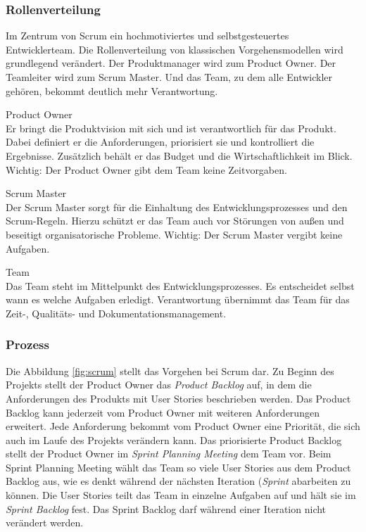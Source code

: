 \subsubsection{Rollenverteilung}
Im Zentrum von Scrum ein hochmotiviertes und selbstgesteuertes Entwicklerteam. Die Rollenverteilung von klassischen Vorgehensmodellen wird grundlegend verändert. Der Produktmanager wird zum Product Owner. Der Teamleiter wird zum Scrum Master. Und das Team, zu dem alle Entwickler gehören, bekommt deutlich mehr Verantwortung.

\begin{description}
\item{Product Owner}\\
Er bringt die Produktvision mit sich und ist verantwortlich für das Produkt. Dabei definiert er die Anforderungen, priorisiert sie und kontrolliert die Ergebnisse. Zusätzlich behält er das Budget und die Wirtschaftlichkeit im Blick. Wichtig: Der Product Owner gibt dem Team keine Zeitvorgaben.

\item{Scrum Master}\\
Der Scrum Master sorgt für die Einhaltung des Entwicklungsprozesses und den Scrum-Regeln. Hierzu schützt er das Team auch vor Störungen von außen und beseitigt organisatorische Probleme. Wichtig: Der Scrum Master vergibt keine Aufgaben.

\item{Team}\\
Das Team steht im Mittelpunkt des Entwicklungsprozesses. Es entscheidet selbst wann es welche Aufgaben erledigt. Verantwortung übernimmt das Team für das Zeit-, Qualitäts- und Dokumentationsmanagement.
\end{description}

\subsubsection{Prozess}
Die Abbildung \ref{fig:scrum} stellt das Vorgehen bei Scrum dar. Zu Beginn des Projekts stellt der Product Owner das \emph{Product Backlog} auf, in dem die Anforderungen des Produkts mit User Stories beschrieben werden. Das Product Backlog kann jederzeit vom Product Owner mit weiteren Anforderungen erweitert. Jede Anforderung bekommt vom Product Owner eine Priorität, die sich auch im Laufe des Projekts verändern kann. Das priorisierte Product Backlog stellt der Product Owner im \emph{Sprint Planning Meeting} dem Team vor. Beim Sprint Planning Meeting wählt das Team so viele User Stories aus dem Product Backlog aus, wie es denkt während der nächsten Iteration (\emph{Sprint} abarbeiten zu können. Die User Stories teilt das Team in einzelne Aufgaben auf und hält sie im \emph{Sprint Backlog} fest. Das Sprint Backlog darf während einer Iteration nicht verändert werden.

